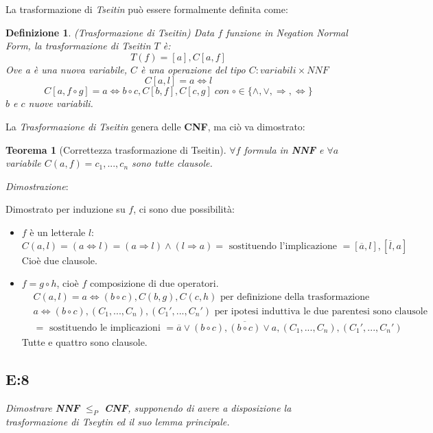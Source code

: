 \documentclass[a4paper]{article}
\newtheorem*{theorem}{Teorema}
\newtheorem*{definition}{Definizione}
\newenvironment{dimostrazione}{\textit{Dimostrazione}:\begin{adjustwidth}{1cm}{}}{\end{adjustwidth}}
\begin{document}
La trasformazione di \textit{Tseitin} può essere formalmente definita come:
\begin{definition}(Trasformazione di Tseitin)
 	Data $f$ funzione in Negation Normal Form, la trasformazione di Tseitin $T$ è:
	$$ T(f) = [a],C[a,f]$$
	Ove a è una nuova variabile, $C$ è una operazione del tipo $C: variabili \times NNF$
	$$C[a,l] = a \Leftrightarrow l$$
	$$C[a,f \circ g] = a \Leftrightarrow b \circ c, C[b,f],C[c,g]\; con \; \circ \in \{\land,\lor, \Rightarrow, \Leftrightarrow\}$$
	$b$ e $c$ nuove variabili.
\end{definition}
La \textit{Trasformazione di Tseitin} genera delle \textbf{CNF}, ma ciò va dimostrato:
\begin{theorem}[Correttezza trasformazione di Tseitin]
	$\forall f $ formula in \textbf{NNF} e $\forall a$ variabile $C(a,f) = c_1,...,c_n$ sono tutte clausole.
\end{theorem}
\begin{dimostrazione}
	Dimostrato per induzione su $f$, ci sono due possibilità:
	\begin{itemize}
		\item $f$ è un letterale $l$:
			\begin{equation*}
			C(a,l) = (a \Leftrightarrow l) = (a \Rightarrow l) \land (l \Rightarrow a)= 
			\text{ sostituendo l'implicazione } = [ \overline a, l],[ \overline l, a]
			\end{equation*}
			Cioè due clausole.
		\item $f = g \circ h$, cioè $f$ composizione di due operatori.
			\begin{align*}
				&C(a,l) = a \Leftrightarrow (b \circ c),C(b,g), C(c,h) \text{ per definizione della trasformazione} \\
				&a \Leftrightarrow (b \circ c), (C_1,...,C_n), (C_1',..., C_n') \text{ per ipotesi induttiva le due parentesi sono clausole}\\
				&= \text{ sostituendo le implicazioni } = \overline a \lor  (b \circ c), \overline{(b \circ c)} \lor a, (C_1,...,C_n), (C_1',..., C_n')
                        \end{align*}
			Tutte e quattro sono clausole.
	\end{itemize}
\end{dimostrazione}
\subsection{E:8}
\emph{Dimostrare \textbf{NNF} $\leq_P$ \textbf{CNF}, supponendo di avere a disposizione la trasformazione di Tseytin ed il suo lemma principale.}
\end{document}
